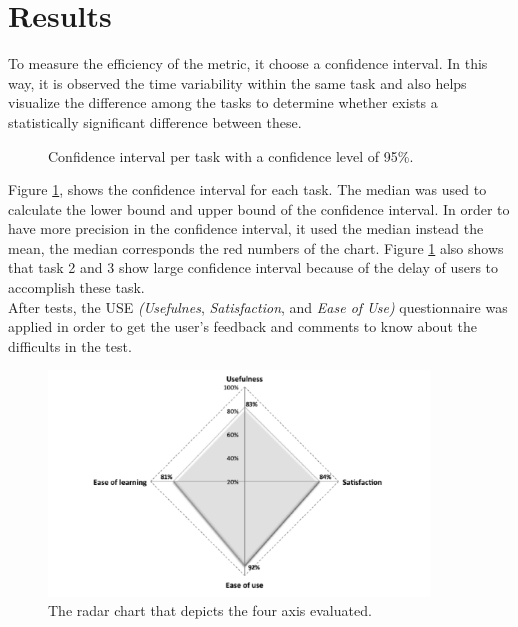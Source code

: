 \section{Results}

To measure the efficiency of the metric, it choose a confidence
interval. In this way, it is observed the time variability within the
same task and also helps visualize the difference among the tasks to
determine whether exists a statistically significant difference
between these. 
\begin{figure}
\centering
\captionsetup{font=footnotesize}
\caption{Confidence interval per task with a confidence level of 95\%.}
\label{fig:ci95}   
\end{figure}
Figure \ref{fig:ci95}, shows the confidence interval for each task.
The median was used to calculate the  lower bound and upper bound of
the confidence interval. In  order to have more precision in the
confidence interval, it used the median instead the mean, the median
corresponds the red numbers of the chart. Figure \ref{fig:ci95} also 
shows that task 2 and 3 show large confidence interval because of  
the delay of users to accomplish these task. \\ 
After tests, the USE \textit{(Usefulnes}, \textit{Satisfaction}, and 
\textit{Ease of Use)} questionnaire \cite{morris2001experience} 
was applied in order to get the user's feedback and comments 
to know about the difficults in the test.  
\begin{figure}
\centering
\small
\captionsetup{font=footnotesize}
\includegraphics[width=0.9\textwidth]{img/radial.png}
\caption{\small{The radar chart that depicts the four axis 
evaluated.}}
\label{fig:radial}   
\end{figure}
